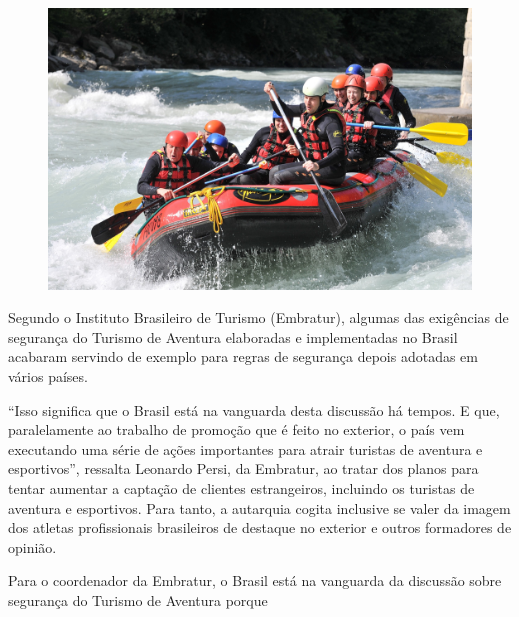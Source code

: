 \begin{myquote}

\begin{figure}[H]
\centering
\includegraphics[scale=0.25]{./imgSAEB_7_POR/media/image40.png}
\end{figure}

Segundo o Instituto Brasileiro de Turismo (Embratur), algumas das exigências de
segurança do Turismo de Aventura elaboradas e implementadas no Brasil acabaram 
servindo de exemplo para regras de segurança depois adotadas em vários países.

``Isso significa que o Brasil está na vanguarda desta discussão há tempos. E
que, paralelamente ao trabalho de promoção que é feito no exterior, o país vem
executando uma série de ações importantes para atrair turistas de aventura e
esportivos'', ressalta Leonardo Persi, da Embratur, ao tratar dos planos para tentar
aumentar a captação de clientes estrangeiros, incluindo os turistas de
aventura e esportivos. Para tanto, a autarquia cogita inclusive se valer da
imagem dos atletas profissionais brasileiros de destaque no exterior e outros
formadores de opinião.

\end{myquote}

Para o coordenador da Embratur, o Brasil está na vanguarda da discussão sobre 
segurança do Turismo de Aventura porque 

